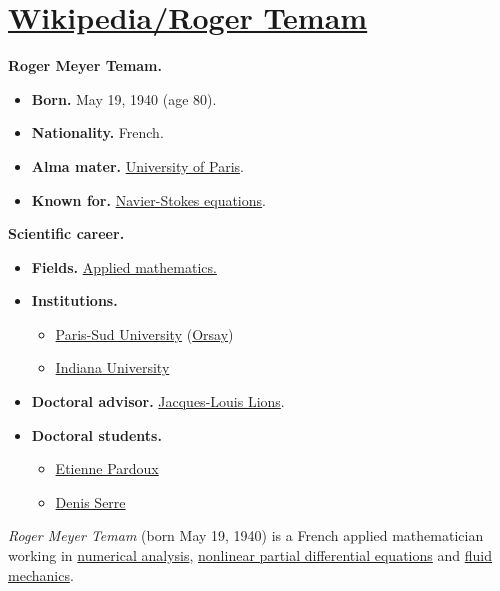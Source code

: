 \documentclass{book}
\numberwithin{equation}{section}
\begin{document}

\chapter{\href{https://en.wikipedia.org/wiki/Roger_Temam}{Wikipedia/Roger Temam}}

\textbf{Roger Meyer Temam.}
\begin{itemize}
    \item \textbf{Born.} May 19, 1940 (age 80).
    \item \textbf{Nationality.} French.
    \item \textbf{Alma mater.} \href{https://en.wikipedia.org/wiki/University_of_Paris}{University of Paris}.
    \item \textbf{Known for.} \href{https://en.wikipedia.org/wiki/Navier-Stokes_equations}{Navier-Stokes equations}.
\end{itemize}
\textbf{Scientific career.}
\begin{itemize}
    \item \textbf{Fields.} \href{https://en.wikipedia.org/wiki/Applied_mathematics}{Applied mathematics.}
    \item \textbf{Institutions.}
    \begin{itemize}
        \item \href{https://en.wikipedia.org/wiki/Paris-Sud_University}{Paris-Sud University} (\href{https://en.wikipedia.org/wiki/Orsay}{Orsay})
        \item \href{https://en.wikipedia.org/wiki/Indiana_University_Bloomington}{Indiana University}
    \end{itemize}
    \item \textbf{Doctoral advisor.} \href{https://en.wikipedia.org/wiki/Jacques-Louis_Lions}{Jacques-Louis Lions}.
    \item \textbf{Doctoral students.}
    \begin{itemize}
        \item \href{https://en.wikipedia.org/wiki/Etienne_Pardoux}{Etienne Pardoux}
        \item \href{https://en.wikipedia.org/wiki/Denis_Serre}{Denis Serre}
    \end{itemize}
\end{itemize}
\textit{Roger Meyer Temam} (born May 19, 1940) is a French applied mathematician working in \href{https://en.wikipedia.org/wiki/Numerical_analysis}{numerical analysis}, \href{https://en.wikipedia.org/wiki/Nonlinear_partial_differential_equations}{nonlinear partial differential equations} and \href{https://en.wikipedia.org/wiki/Fluid_mechanics}{fluid mechanics}.
\end{document}
